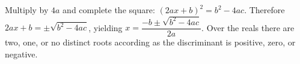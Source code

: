 Multiply by $4a$ and complete the square: $(2ax+b)^2=b^2-4ac$. Therefore $2ax+b=\pm\sqrt{b^2-4ac}$, yielding $\boxed{x=\dfrac{-b\pm\sqrt{b^2-4ac}}{2a}}$. Over the reals there are two, one, or no distinct roots according as the discriminant is positive, zero, or negative.
